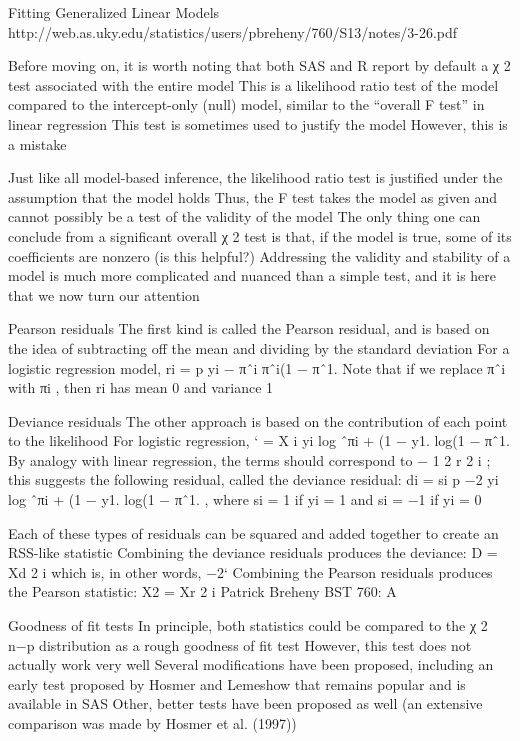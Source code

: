 Fitting Generalized Linear Models
http://web.as.uky.edu/statistics/users/pbreheny/760/S13/notes/3-26.pdf

Before moving on, it is worth noting that both SAS and R
report by default a χ
2
test associated with the entire model
This is a likelihood ratio test of the model compared to the
intercept-only (null) model, similar to the “overall F test” in
linear regression
This test is sometimes used to justify the model
However, this is a mistake

Just like all model-based inference, the likelihood ratio test is
justified under the assumption that the model holds
Thus, the F test takes the model as given and cannot
possibly be a test of the validity of the model
The only thing one can conclude from a significant overall χ
2
test is that, if the model is true, some of its coefficients are
nonzero (is this helpful?)
Addressing the validity and stability of a model is much more
complicated and nuanced than a simple test, and it is here
that we now turn our attention

Pearson residuals
The first kind is called the Pearson residual, and is based on
the idea of subtracting off the mean and dividing by the
standard deviation
For a logistic regression model,
ri = p
yi − πˆi
πˆi(1 − πˆ1. 
Note that if we replace πˆi with πi
, then ri has mean 0 and
variance 1

Deviance residuals
The other approach is based on the contribution of each point
to the likelihood
For logistic regression,
` =
X
i
{yi
log ˆπi + (1 − y1. log(1 − πˆ1. }
By analogy with linear regression, the terms should correspond
to −
1
2
r
2
i
; this suggests the following residual, called the
deviance residual:
di = si
p
−2 {yi
log ˆπi + (1 − y1. log(1 − πˆ1. },
where si = 1 if yi = 1 and si = −1 if yi = 0


Each of these types of residuals can be squared and added
together to create an RSS-like statistic
Combining the deviance residuals produces the deviance:
D =
Xd
2
i
which is, in other words, −2`
Combining the Pearson residuals produces the Pearson
statistic:
X2 =
Xr
2
i
Patrick Breheny BST 760: A

Goodness of fit tests
In principle, both statistics could be compared to the χ
2
n−p
distribution as a rough goodness of fit test
However, this test does not actually work very well
Several modifications have been proposed, including an early
test proposed by Hosmer and Lemeshow that remains popular
and is available in SAS
Other, better tests have been proposed as well (an extensive
comparison was made by Hosmer et al. (1997))


